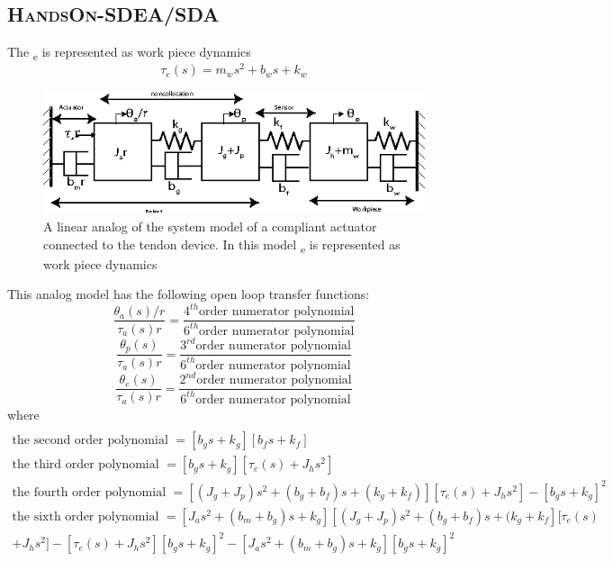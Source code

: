 \documentclass[a4paper,12pt]{article}
\begin{document}
\subsection{\textsc{HandsOn-SDEA/SDA}}
The \texttau  \textsubscript{e} is represented as work piece dynamics
\begin{equation}
\tau_{e}(s)=m_ws^2+b_ws+k_w
\end{equation}
\begin{figure}[h]
\centering
\includegraphics[scale=2]{seav2.eps}
\caption{A linear analog of the system model of a compliant actuator connected to the tendon device. In this model \texttau  \textsubscript{e} is represented as work piece dynamics}
\label{fig:model2}
\end{figure}
This analog model has the following open loop transfer functions\cite{eppinger}:
\begin{equation}
\frac{\theta_a(s)/r}{\tau_a(s)r}=\frac{4^{th}\text{order numerator polynomial}}{6^{th}\text{order numerator polynomial}}
\end{equation}
\begin{equation}
\frac{\theta_p(s)}{\tau_a(s)r}=\frac{3^{rd}\text{order numerator polynomial}}{6^{th}\text{order numerator polynomial}}
\end{equation}
\begin{equation}
\frac{\theta_e(s)}{\tau_a(s)r}=\frac{2^{nd}\text{order numerator polynomial}}{6^{th}\text{order numerator polynomial}}
\end{equation}
where 
\begin{equation}
\begin{multlined}\\
\text{the second order polynomial } = [b_gs+k_g][b_fs+k_f]\\
\text{the third order polynomial } = [b_gs+k_g][\tau_{e}(s)+J_hs^2]\\
\text{the fourth order polynomial } = [(J_g+J_p)s^2+(b_g+b_f)s+(k_g+k_f)][\tau_{e}(s)+J_hs^2]-[b_gs+k_g]^2 \\
\text{the sixth order polynomial } = [J_as^2+(b_m+b_g)s+k_g][(J_g+J_p)s^2+(b_g+b_f)s+(k_g+k_f][\tau_{e}(s)\\+J_hs^2]-[\tau_{e}(s)+J_hs^2][b_gs+k_g]^2-[J_as^2+(b_m+b_g)s+k_g][b_gs+k_g]^2
\end{multlined}
\end{equation}
\end{document}
